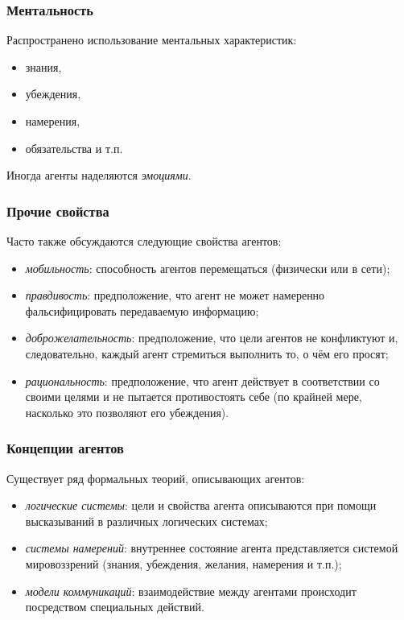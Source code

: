 \documentclass{beamer}
\begin{document}
\begin{frame}
\frametitle{Ментальность}
  Распространено использование ментальных характеристик:

  \begin{itemize}
    \item знания,
    \item убеждения,
    \item намерения,
    \item обязательства и т.п.
  \end{itemize}

  Иногда агенты наделяются {\it эмоциями}.
\end{frame}

\begin{frame}
\frametitle{Прочие свойства}
  Часто также обсуждаются следующие свойства агентов:

  \begin{itemize}
    \item {\it мобильность}: способность агентов перемещаться (физически или в сети);
    \item {\it правдивость}: предположение, что агент не может намеренно фальсифицировать передаваемую информацию;
    \item {\it доброжелательность}: предположение, что цели агентов не конфликтуют и, следовательно, каждый агент
      стремиться выполнить то, о чём его просят;
    \item {\it рациональность}: предположение, что агент действует в соответствии со своими целями и не пытается
      противостоять себе (по крайней мере, насколько это позволяют его убеждения).
  \end{itemize}
\end{frame}

\begin{frame}
\frametitle{Концепции агентов}
  Существует ряд формальных теорий, описывающих агентов:

  \begin{itemize}
    \item {\it логические системы}:
      цели и свойства агента описываются при помощи высказываний
      в различных логических системах;
    \item {\it системы намерений}:
      внутреннее состояние агента представляется системой
      мировоззрений (знания, убеждения, желания, намерения и т.п.);
    \item {\it модели коммуникаций}:
      взаимодействие между агентами происходит посредством специальных
      действий.
  \end{itemize}
\end{frame}
\end{document}
